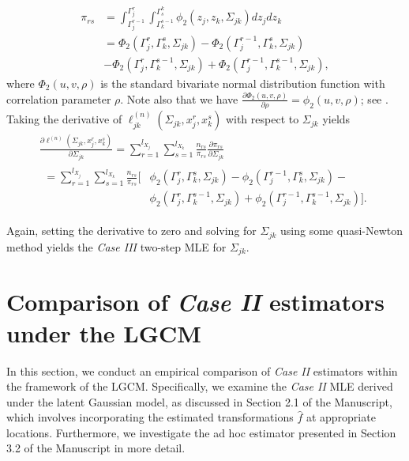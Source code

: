 \begin{equation}
    \begin{split}
        \pi_{rs} &= \int_{{\Gamma}_j^{r-1}}^{{\Gamma}_j^{r}} \int_{{\Gamma}_k^{s-1}}^{{\Gamma}^k_{s}} \phi_2(z_j,z_k,\Sigma_{jk}) dz_j dz_k \\
        &= \Phi_2({\Gamma}_j^r, {\Gamma}_k^s, \Sigma_{jk}) - \Phi_2({\Gamma}_j^{r-1}, {\Gamma}_k^s, \Sigma_{jk}) \\
        &- \Phi_2({\Gamma}_j^r, {\Gamma}_k^{s-1}, \Sigma_{jk}) + \Phi_2({\Gamma}_j^{r-1}, {\Gamma}_k^{s-1}, \Sigma_{jk}),
    \end{split}
\end{equation}
where $\Phi_2(u,v,\rho)$ is the standard bivariate normal distribution function with correlation parameter $\rho$. Note also that we have $\frac{\partial \Phi_2(u,v, \rho)}{\partial \rho} = \phi_2(u,v, \rho)$; see \citep{Tallis62}. Taking the derivative of $\ell_{jk}^{(n)}(\Sigma_{jk}, x_j^r,x_k^s)$ with respect to $\Sigma_{jk}$ yields
\begin{multline*}
    \frac{\partial \ell^{(n)}(\Sigma_{jk}, x_j^r,x_k^s)}{\partial \Sigma_{jk}} = \sum_{r=1}^{l_{X_{j}}}\sum_{s=1}^{l_{X_{k}}} \frac{n_{rs}}{\pi_{rs}} \frac{\partial \pi_{rs}}{\partial \Sigma_{jk}} \\
    \begin{aligned}
        = \sum_{r=1}^{l_{X_{j}}}\sum_{s=1}^{l_{X_{k}}} \frac{n_{rs}}{\pi_{rs}} \Big[ & \phi_2({\Gamma}_j^r, {\Gamma}_k^s, \Sigma_{jk}) - \phi_2({\Gamma}_j^{r-1}, {\Gamma}_k^s, \Sigma_{jk}) -             \\
                                                                                     & \phi_2({\Gamma}_j^r, {\Gamma}_k^{s-1}, \Sigma_{jk}) + \phi_2({\Gamma}_j^{r-1}, {\Gamma}_k^{s-1}, \Sigma_{jk})\Big].
    \end{aligned}
\end{multline*}

Again, setting the derivative to zero and solving for $\Sigma_{jk}$ using some quasi-Newton method yields the \textit{Case III} two-step MLE for $\Sigma_{jk}$.

\section{Comparison of \textit{Case II} estimators under the LGCM}\label{sec::case2_comparison}

In this section, we conduct an empirical comparison of \textit{Case II} estimators within the framework of the LGCM. Specifically, we examine the \textit{Case II} MLE derived under the latent Gaussian model, as discussed in Section 2.1 of the Manuscript, which involves incorporating the estimated transformations \(\hat{f}\) at appropriate locations. Furthermore, we investigate the ad hoc estimator presented in Section 3.2 of the Manuscript in more detail.

